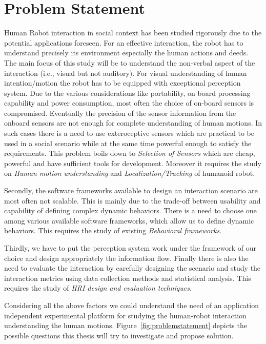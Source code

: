 \section{Problem Statement}
\label{sec:problem_statement}
	Human Robot interaction in social context has been studied rigorously due to the potential applications foreseen. For an effective interaction, the robot has to understand precisely its environment especially the human actions and deeds. The main focus of this study will be to understand the non-verbal aspect of the interaction (i.e., visual but not auditory). For visual understanding of human intention/motion the robot has to be equipped with exceptional perception system. Due to the various considerations like portability, on board processing capability and power consumption, most often the choice of on-board sensors is compromised. Eventually the precision of the sensor information from the onboard sensors are not enough for complete understanding of human motions. In such cases there is a need to use exteroceptive sensors which are practical to be used in a social scenario while at the same time powerful enough to satisfy the requirements. This problem boils down to \emph{Selection of Sensors} which are cheap, powerful and have sufficient tools for development. Moreover it requires the study on \emph{Human motion understanding} and \emph{Localization/Tracking} of humanoid robot.
	
	Secondly, the software frameworks available to design an interaction scenario are most often not scalable. This is mainly due to the trade-off between usability and capability of defining complex dynamic behaviors. There is a need to choose one among various available software frameworks, which allow us to define dynamic behaviors. This requires the study of existing \emph{Behavioral frameworks}.

	Thirdly, we have to put the perception system work under the framework of our choice and design appropriately the information flow. Finally there is also the need to evaluate the interaction by carefully designing the scenario and study the interaction metrics using data collection methods and statistical analysis. This requires the study of \emph{HRI design and evaluation techniques}.

	Considering all the above factors we could understand the need of an application independent experimental platform for studying the human-robot interaction understanding the human motions. Figure~\ref{fig:problemstatement} depicts the possible questions this thesis will try to investigate and propose solution. 

